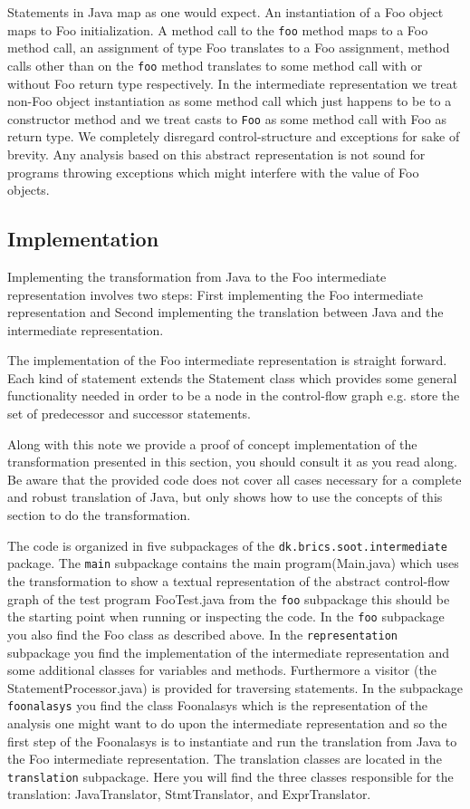 \documentclass{article}
\newcommand{\code}[1]{\texttt{\small #1}}
\begin{document}
Statements in Java map as one would expect. An instantiation of a Foo
object maps to Foo initialization. A method call to the \code{foo}
method maps to a Foo method call, an assignment of type Foo translates
to a Foo assignment, method calls other than on the \code{foo} method
translates to some method call with or without Foo return type
respectively. In the intermediate representation we treat non-Foo
object instantiation as some method call which just happens to be to a
constructor method and we treat casts to \code{Foo} as some method
call with Foo as return type. We completely disregard
control-structure and exceptions for sake of brevity. Any analysis
based on this abstract representation is not sound for programs
throwing exceptions which might interfere with the value of Foo
objects.

\subsection{Implementation}
Implementing the transformation from Java to the Foo intermediate
representation involves two steps: First implementing the Foo
intermediate representation and Second implementing the translation
between Java and the intermediate representation. 

The implementation of the Foo intermediate representation is straight
forward. Each kind of statement extends the Statement class which
provides some general functionality needed in order to be a node in
the control-flow graph e.g. store the set of predecessor and successor
statements.

Along with this note we provide a proof of concept implementation of
the transformation presented in this section, you should consult it as
you read along. Be aware that the provided code does not cover all
cases necessary for a complete and robust translation of Java, but
only shows how to use the concepts of this section to do the
transformation.

The code is organized in five subpackages of the
\code{dk.brics.soot.intermediate} package. The \code{main} subpackage
contains the main program(Main.java) which uses the transformation to
show a textual representation of the abstract control-flow graph of
the test program FooTest.java from the \code{foo} subpackage this should
be the starting point when running or inspecting the code. In the
\code{foo} subpackage you also find the Foo class as described above.
%
In the \code{representation} subpackage you find the implementation of
the intermediate representation and some additional classes for
variables and methods. Furthermore a visitor (the
StatementProcessor.java) is provided for traversing statements.
%
In the subpackage \code{foonalasys} you find the class Foonalasys which
is the representation of the analysis one might want to do upon the
intermediate representation and so the first step of the Foonalasys is
to instantiate and run the translation from Java to the Foo
intermediate representation.
%
The translation classes are located in the \code{translation}
subpackage. Here you will find the three classes responsible for the
translation: JavaTranslator, StmtTranslator, and ExprTranslator.\\
\end{document}
